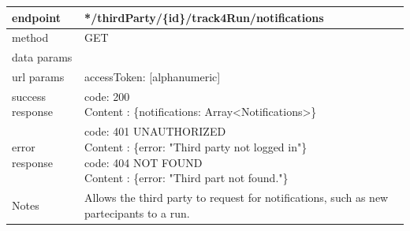 \begin{legal}
\begin{legal}
\begin{itemize}
								\begin{tabularx}{\linewidth}{| l | l |}
									\hline
									endpoint & */thirdParty/\{id\}/track4Run/notifications \\
									\hline
									method & GET \\
									\hline
									data params & \\
									\hline
									url params &
									\parbox{0.7\textwidth}{
										\bigskip
										accessToken: [alphanumeric]
										\bigskip
									} \\
									\hline
									success response &
									\parbox{0.7\textwidth}{
										\bigskip
										code: 200\\
										Content : \{notifications: Array<Notifications>\}
										\bigskip
									} \\
									\hline
									error response &
									\parbox{0.7\textwidth}{
										\bigskip
										code: 401 UNAUTHORIZED \\
										Content : \{error: "Third party not logged in"\}\\
										code: 404 NOT FOUND \\
										Content : \{error: "Third part not found."\}
										\bigskip
									} \\
									\hline
									Notes & 
									\parbox{0.7\textwidth}{
										\bigskip Allows the third party to request for notifications, such as new partecipants to a run.
									\bigskip}  \\
									\hline
								\end{tabularx}\\


\end{itemize}
\end{legal}
\end{legal}
